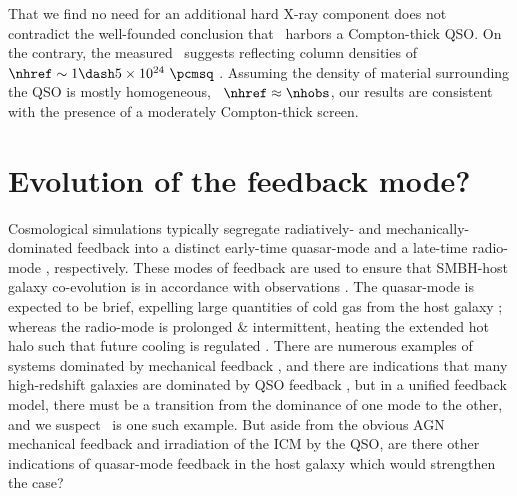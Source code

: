 \documentclass[useAMS,usenatbib]{mn2e}
\begin{document}
That we find no need for an additional hard X-ray component does not
contradict the well-founded conclusion that \irs\ harbors a
Compton-thick QSO. On the contrary, the measured \fekaew\ suggests
reflecting column densities of $\nhref \sim 1 \dash 5 \times 10^{24}
~\pcmsq$ \citep{1993MNRAS.263..314L, 2005A&A...444..119G,
  2010arXiv1005.3253C}. Assuming the density of material surrounding
the QSO is mostly homogeneous, \ie\ $\nhref \approx \nhobs$, our
results are consistent with the presence of a moderately Compton-thick
screen.

\section{Evolution of the feedback mode?}
\label{sec:evo}

Cosmological simulations typically segregate radiatively- and
mechanically-dominated feedback into a distinct early-time quasar-mode
\citep[\eg][]{2005Natur.435..629S} and a late-time radio-mode
\citep[\eg][]{croton06}, respectively. These modes of feedback are
used to ensure that SMBH-host galaxy co-evolution is in accordance
with observations \citep[\eg][]{magorrian}. The quasar-mode is
expected to be brief, expelling large quantities of cold gas from the
host galaxy \citep{2006ApJ...642L.107N}; whereas the radio-mode is
prolonged \& intermittent, heating the extended hot halo such that
future cooling is regulated \citep[see][for a review]{mcnamrev}. There
are numerous examples of systems dominated by mechanical feedback
\citep[\eg][]{perseus1, ms0735}, and there are indications that many
high-redshift galaxies are dominated by QSO feedback \citep[see][for a
  review]{2005ARA&A..43..769V}, but in a unified feedback model, there
must be a transition from the dominance of one mode to the other, and
we suspect \irs\ is one such example. But aside from the obvious AGN
mechanical feedback and irradiation of the ICM by the QSO, are there
other indications of quasar-mode feedback in the host galaxy which
would strengthen the case?
\end{document}
